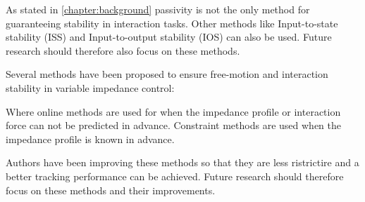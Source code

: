 As stated in \ref{chapter:background} passivity is not the only method for guaranteeing stability in interaction tasks. Other methods like Input-to-state stability (ISS) and Input-to-output stability (IOS) can also be used. Future research should therefore also focus on these methods.

Several methods have been proposed to ensure free-motion and interaction stability in variable impedance control:

Where online methods are used for when the impedance profile or interaction force can not be predicted in advance. Constraint methods are used when the impedance profile is known in advance.

Authors have been improving these methods so that they are less ristrictire and a better tracking performance can be achieved. Future research should therefore focus on these methods and their improvements. 
